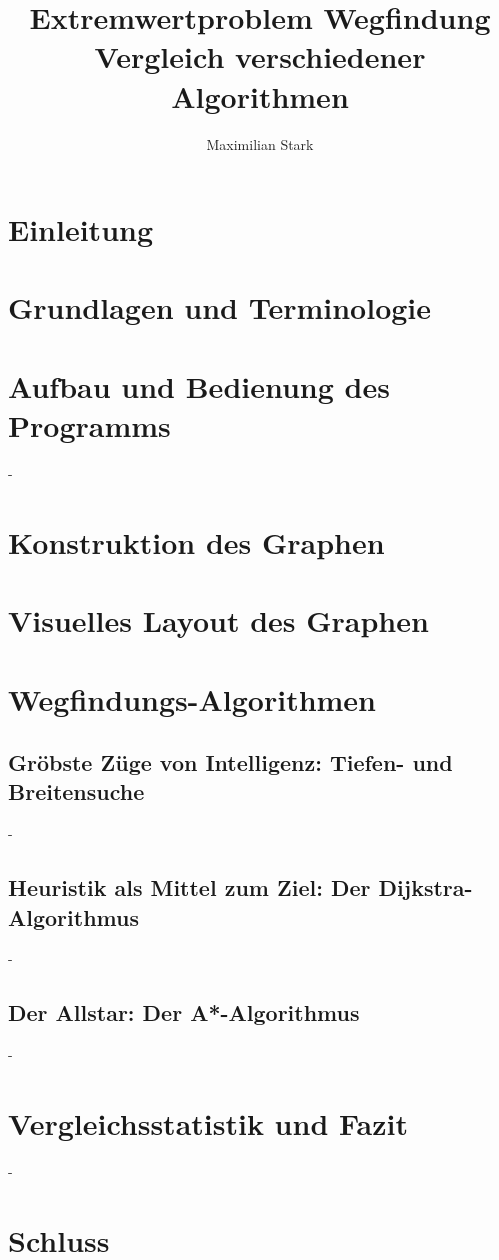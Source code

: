 \documentclass[12pt]{article}
\begin{document}
\title{Extremwertproblem Wegfindung \\  \large{\enspace Vergleich verschiedener Algorithmen}}

\author{Maximilian Stark}

\maketitle
\thispagestyle{empty}
\clearpage

\tableofcontents
\clearpage

\section{Einleitung}
\newpage

\section{Grundlagen und Terminologie}
\newpage

\section{Aufbau und Bedienung des Programms}
\newpage
-
\newpage

\section{Konstruktion des Graphen}
\newpage

\section{Visuelles Layout des Graphen}
\newpage

\section{Wegfindungs-Algorithmen}
\newpage

\subsection{Gröbste Züge von Intelligenz: Tiefen- und Breitensuche}
\newpage
-
\newpage

\subsection{Heuristik als Mittel zum Ziel: Der Dijkstra-Algorithmus}
\newpage
-
\newpage

\subsection{Der Allstar: Der A*-Algorithmus}
\newpage
-
\newpage

\section{Vergleichsstatistik und Fazit}
\newpage
-
\newpage

\section{Schluss}
\end{document}
